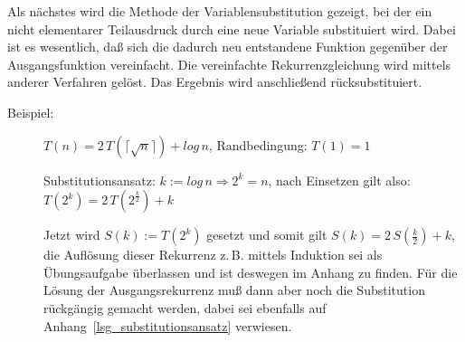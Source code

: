\documentclass[ngerman]{scrreprt}%
\theoremstyle{break}
\begin{document}
Als nächstes wird die Methode der Variablensubstitution gezeigt,
bei der ein nicht elementarer Teilausdruck durch eine neue Variable substituiert wird. Dabei ist es wesentlich, daß
sich die dadurch neu entstandene Funktion gegenüber der Ausgangsfunktion vereinfacht. Die vereinfachte Rekurrenzgleichung wird
mittels anderer Verfahren gelöst. Das Ergebnis wird anschließend rücksubstituiert.
	\begin{description}
		\item [Beispiel:] $T(n) = 2\,T(\lceil\sqrt{n}\rceil) + log\,n$, Randbedingung: $T(1)=1$

		Substitutionsansatz: $k:=log\,n \Rightarrow 2^k=n$, nach Einsetzen gilt also: $T(2^k) = 2\,T(2^{\frac{k}{2}})+k$
		
		Jetzt wird $S(k) := T(2^k)$ gesetzt und somit gilt $S(k) = 2\,S\left(\frac{k}{2}\right)+k$, die Auflösung dieser
		Rekurrenz z.\,B. mittels Induktion sei als Übungsaufgabe überlassen und ist deswegen im Anhang zu finden. 
		Für die Lösung der Ausgangsrekurrenz muß dann aber noch die Substitution rückgängig gemacht werden, dabei sei
		ebenfalls auf Anhang~\autoref{lsg_substitutionsansatz} verwiesen. 
	\end{description}	
\end{document}

